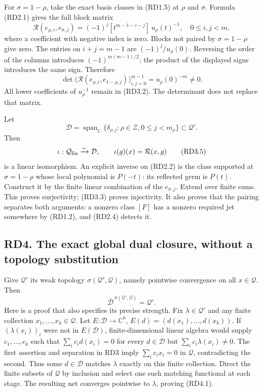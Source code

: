 For \(\sigma=1-\rho\), take the exact basis classes in (RD1.5) at
\(\rho\) and \(\sigma\). Formula (RD2.1) gives the full block matrix \[
\mathcal R(e_{\rho,i},e_{\sigma,j})
=(-1)^j[t^{m-1-i-j}]\,u_\rho(t)^{-1},\quad
0\le i,j<m,
\tag{RD3.2}
\] where a coefficient with negative index is zero. Blocks not paired by
\(\sigma=1-\rho\) give zero. The entries on \(i+j=m-1\) are
\((-1)^j/u_\rho(0)\). Reversing the order of the columns introduces
\((-1)^{m(m-1)/2}\); the product of the displayed signs introduces the
same sign. Therefore \[
\det\bigl(\mathcal R(e_{\rho,i},e_{1-\rho,j})\bigr)_{i,j=0}^{m-1}
=u_\rho(0)^{-m}\ne0.
\tag{RD3.3}
\] All lower coefficients of \(u_\rho^{-1}\) remain in (RD3.2). The
determinant does not replace that matrix.

Let \[
\mathcal D=\operatorname{span}_{\mathbb C}
\{\delta_{\rho,j}:\rho\in\mathscr Z,0\le j<m_\rho\}
\subset\mathcal Q'.
\tag{RD3.4}
\] Then \[
\iota:\mathcal Q_{\rm fin}\xrightarrow{\sim}\mathcal D,
\qquad \iota(g)(x)=\mathcal R(x,g)
\tag{RD3.5}
\] is a linear isomorphism. An explicit inverse on (RD2.2) is the class
supported at \(\sigma=1-\rho\) whose local polynomial is \(P(-t)\): its
reflected germ is \(P(t)\). Construct it by the finite linear
combination of the \(e_{\sigma,j}\). Extend over finite sums. This
proves surjectivity; (RD3.3) proves injectivity. It also proves that the
pairing separates both arguments: a nonzero class \([F]\) has a nonzero
required jet somewhere by (RD1.2), and (RD2.4) detects it.

\subsection{RD4. The exact global dual closure, without a topology
substitution}\label{rd4.-the-exact-global-dual-closure-without-a-topology-substitution}

Give \(\mathcal Q'\) its weak topology
\(\sigma(\mathcal Q',\mathcal Q)\), namely pointwise convergence on all
\(x\in\mathcal Q\). Then \[
\overline{\mathcal D}^{\,\sigma(\mathcal Q',\mathcal Q)}=\mathcal Q'.
\tag{RD4.1}
\] Here is a proof that also specifies its precise strength. Fix
\(\lambda\in\mathcal Q'\) and any finite collection
\(x_1,\ldots,x_k\in\mathcal Q\). Let \(E:\mathcal D\to\mathbb C^k\),
\(E(d)=(d(x_1),\ldots,d(x_k))\). If \((\lambda(x_i))_i\) were not in
\(E(\mathcal D)\), finite-dimensional linear algebra would supply
\(c_1,\ldots,c_k\) such that \(\sum_i c_i d(x_i)=0\) for every
\(d\in\mathcal D\) but \(\sum_i c_i\lambda(x_i)\ne0\). The first
assertion and separation in RD3 imply \(\sum_i c_ix_i=0\) in
\(\mathcal Q\), contradicting the second. Thus some \(d\in\mathcal D\)
matches \(\lambda\) exactly on this finite collection. Direct the finite
subsets of \(\mathcal Q\) by inclusion and select one such matching
functional at each stage. The resulting net converges pointwise to
\(\lambda\), proving (RD4.1).

